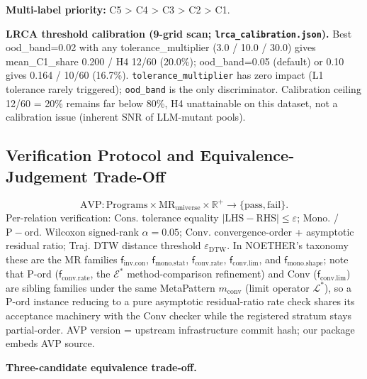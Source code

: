 \documentclass[manuscript,screen,review]{acmart}
\begin{document}
\textbf{Multi-label priority:} C5 \textgreater{} C4 \textgreater{} C3
\textgreater{} C2 \textgreater{} C1.

\textbf{LRCA threshold calibration (9-grid scan;
\texttt{lrca\_calibration.json}).} Best ood\_band=0.02 with any
tolerance\_multiplier (3.0 / 10.0 / 30.0) gives mean\_C1\_share 0.200 /
H4 12/60 (20.0\%); ood\_band=0.05 (default) or 0.10 gives 0.164 / 10/60
(16.7\%). \texttt{tolerance\_multiplier} has zero impact (L1 tolerance
rarely triggered); \texttt{ood\_band} is the only discriminator.
Calibration ceiling 12/60 = 20\% remains far below 80\%, H4
unattainable on this dataset, not a calibration issue (inherent SNR of
LLM-mutant pools).

\subsection{Verification Protocol and Equivalence-Judgement Trade-Off}\label{a.3-avp-protocol-specification-and-equivalence-judgement-trade-off}

\[
\mathrm{AVP}: \mathrm{Programs} \times \mathrm{MR}_{\mathrm{universe}} \times \mathbb{R}^{+} \to \{\mathrm{pass}, \mathrm{fail}\}.
\]
Per-relation verification: $\mathrm{Cons.}$ tolerance equality $|\mathrm{LHS} -
\mathrm{RHS}| \leq \varepsilon$; $\mathrm{Mono.}$ / $\mathrm{P-ord.}$ Wilcoxon signed-rank $\alpha=0.05$; $\mathrm{Conv.}$
convergence-order + asymptotic residual ratio; Traj. DTW distance
threshold $\varepsilon_{\mathrm{DTW}}$. In NOETHER's taxonomy
\citep{noether2026} these are the MR families $\mathsf{f}_{\mathrm{inv.con}}$,
$\mathsf{f}_{\mathrm{mono.stat}}$, $\mathsf{f}_{\mathrm{conv.rate}}$,
$\mathsf{f}_{\mathrm{conv.lim}}$, and $\mathsf{f}_{\mathrm{mono.shape}}$; note
that P-ord ($\mathsf{f}_{\mathrm{conv.rate}}$, the $\mathcal{E}^{*}$
method-comparison refinement) and Conv ($\mathsf{f}_{\mathrm{conv.lim}}$) are
sibling families under the same MetaPattern $m_{\mathrm{conv}}$ (limit operator
$\mathcal{L}^{*}$), so a P-ord instance reducing to a pure asymptotic
residual-ratio rate check shares its acceptance machinery with the Conv
checker while the registered stratum stays partial-order. AVP version = upstream infrastructure commit
hash; our package embeds AVP source.

\textbf{Three-candidate equivalence trade-off.}
\end{document}
